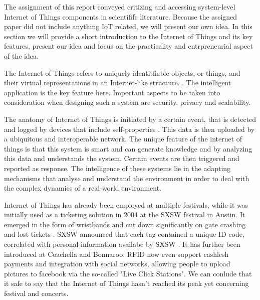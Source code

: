 The assignment of this report conveyed critizing and accessing system-level Internet of Things components in scientififc literature. 
Because the assigned paper did not include anything IoT related, we will present our own idea.
In this section we will provide a short introduction to the Internet of Things and its key features, present our idea and focus on the practicality and entrpreneurial aspect of the idea. 

The Internet of Things refers to uniquely identitfiable objects, or things, and their virtual representations in an Internet-like structure. \cite{lecture}. 
The intelligent application is the key feature here. 
Important aspects to be taken into consideration when designing such a system are security, privacy and scalability. 

The anatomy of Internet of Things is initiated by a certain event, that is detected and logged by devices that include self-properties \cite{lecture}. 
This data is then uploaded by a ubiquitous and interoperable network. 
The unique feature of the internet of things is that this system is smart and can generate knowledge and by analyzing this data and understands the system. 
Certain events are then triggered and reported as response. 
The intelligence of these systems lie in the adapting mechanisms that analyse and understand the environment in order to deal with the complex dynamics of a real-world environment. 

Internet of Things has already been employed at multiple festivals, while it was initially used as a ticketing solution in 2004 at the SXSW festival in Austin. 
It emerged in the form of wristbands and cut down significantly on gate crashing and lost tickets \cite{thingmagic}. 
SXSW announced that each tag contained a unique ID code, correlated with personal information availabe by SXSW \cite{sxsw}. 
It has further been introduced at Coachella and Bonnaroo. \cite{coachella} \cite{bonnaroo} 
RFID now even support cashlesh payments and integration with social networks, allowing people to upload pictures to facebook via the so-called "Live Click Stations"\cite{thingmagic}.
We can conlude that it safe to say that the Internet of Things hasn't reached its peak yet concerning festival and concerts. 
